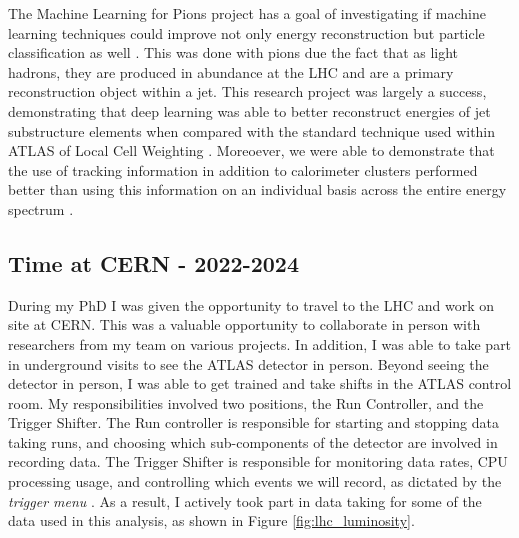\documentclass[12pt]{article}
\begin{document}
The Machine Learning for Pions project has a goal of investigating if machine
learning techniques could improve not only energy reconstruction but particle
classification as well \cite{ml4p_prelim}. This was done with pions due the fact
that as light hadrons, they are produced in abundance at the LHC and are a
primary reconstruction object within a jet. This research project was largely a
success, demonstrating that deep learning was able to better reconstruct
energies of jet substructure elements when compared with the standard technique
used within ATLAS of Local Cell Weighting \cite{ml4p}. Moreoever, we were able
to demonstrate that the use of tracking information in addition to calorimeter
clusters performed better than using this information on an individual basis
across the entire energy spectrum \cite{ml4p}.

\subsection{Time at CERN - 2022-2024}
During my PhD I was given the opportunity to travel to the LHC and work on site
at CERN. This was a valuable opportunity to collaborate in person with
researchers from my team on various projects. In addition, I was able to take
part in underground visits to see the ATLAS detector in person. Beyond seeing
the detector in person, I was able to get trained and take shifts in the ATLAS
control room. My responsibilities involved two positions, the Run Controller,
and the Trigger Shifter. The Run controller is responsible for starting and
stopping data taking runs, and choosing which sub-components of the detector are
involved in recording data. The Trigger Shifter is responsible for monitoring
data rates, CPU processing usage, and controlling which events we will record,
as dictated by the \textit{trigger menu} \cite{trigger_2017, HLT_2016}. As a
result, I actively took part in data taking for some of the data used in this
analysis, as shown in Figure \ref{fig:lhc_luminosity}.
\end{document}
